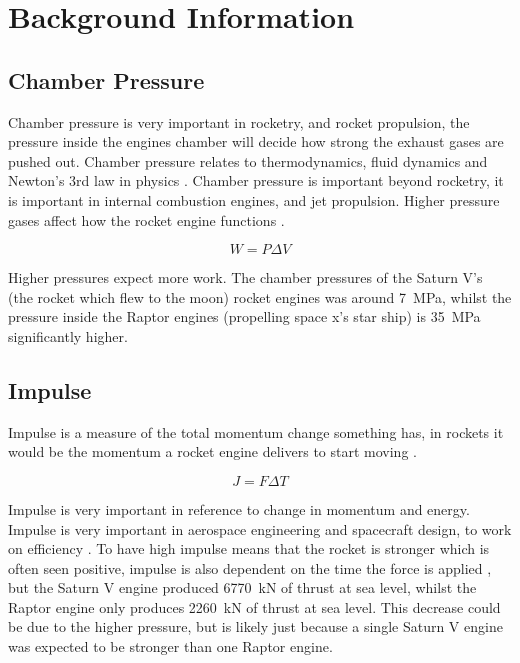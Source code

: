 \documentclass[12pt,a4paper]{article}
\begin{document}
\section{Background Information}

\subsection{Chamber Pressure}

Chamber pressure is very important in rocketry, and rocket propulsion, the pressure inside the engines chamber will decide how strong the exhaust gases are pushed out. Chamber pressure relates to thermodynamics, fluid dynamics and Newton's 3rd law in physics \cite{ref2}. Chamber pressure is important beyond rocketry, it is important in internal combustion engines, and jet propulsion. Higher pressure gases affect how the rocket engine functions \cite{ref1}. 

\begin{equation}
W = P\Delta V
\end{equation}

Higher pressures expect more work. The chamber pressures of the Saturn V's (the rocket which flew to the moon) rocket engines was around \SI{7}{\mega\pascal}, whilst the pressure inside the Raptor engines (propelling space x's star ship) is \SI{35}{\mega\pascal} significantly higher.

\subsection{Impulse}

Impulse is a measure of the total momentum change something has, in rockets it would be the momentum a rocket engine delivers to start moving \cite{ref5}. 

\begin{equation}
J = F\Delta T
\end{equation}

Impulse is very important in reference to change in momentum and energy. Impulse is very important in aerospace engineering and spacecraft design, to work on efficiency \cite{ref3}. To have high impulse means that the rocket is stronger which is often seen positive, impulse is also dependent on the time the force is applied \cite{ref4}, but the Saturn V engine produced \SI{6770}{\kilo\newton} of thrust at sea level, whilst the Raptor engine only produces \SI{2260}{\kilo\newton} of thrust at sea level. This decrease could be due to the higher pressure, but is likely just because a single Saturn V engine was expected to be stronger than one Raptor engine.
\end{document}

